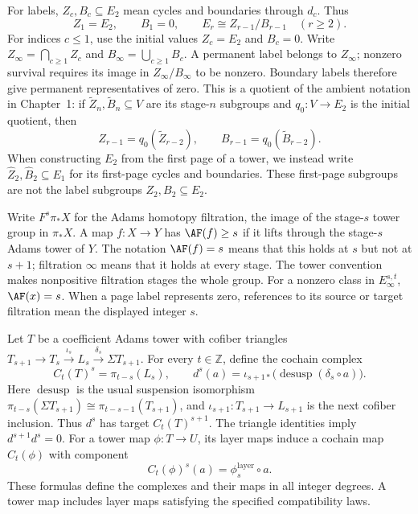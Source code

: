 For labels, $Z_c,B_c\subseteq E_2$ mean cycles and boundaries through
$d_c$. Thus
\[
 Z_1=E_2,\qquad B_1=0,\qquad E_r\cong Z_{r-1}/B_{r-1}\quad(r\ge2).
\]
For indices $c\leq1$, use the initial values $Z_c=E_2$ and $B_c=0$.
Write $Z_\infty=\bigcap_{c\ge1}Z_c$ and
$B_\infty=\bigcup_{c\ge1}B_c$. A permanent label belongs to
$Z_\infty$; nonzero survival requires its image in
$Z_\infty/B_\infty$ to be nonzero. Boundary labels therefore give
permanent representatives of zero.
This is a quotient of the ambient notation in Chapter~1: if
$\widetilde Z_n,\widetilde B_n\subseteq V$ are its stage-$n$ subgroups
and $q_0:V\to E_2$ is the initial quotient, then
\[
 Z_{r-1}=q_0(\widetilde Z_{r-2}),\qquad
 B_{r-1}=q_0(\widetilde B_{r-2}).
\]
When constructing $E_2$ from the first page of a tower, we instead write
$\widehat Z_2,\widehat B_2\subseteq E_1$ for its first-page cycles and
boundaries. These first-page subgroups are not the label subgroups
$Z_2,B_2\subseteq E_2$.

Write $F^s\pi_*X$ for the Adams homotopy filtration, the image of the
stage-$s$ tower group in $\pi_*X$. A map $f:X\to Y$ has
$\AF(f)\ge s$ if it lifts through the stage-$s$ Adams tower of $Y$.
The notation $\AF(f)=s$ means that this holds at $s$ but not at $s+1$;
filtration $\infty$ means that it holds at every stage. The tower
convention makes nonpositive filtration stages the whole group. For a
nonzero class in $E_\infty^{s,t}$, $\AF(x)=s$. When a page label
represents zero, references to its source or target filtration mean the
displayed integer $s$.


\begin{definition}
\label{sem:AdamsSynthetic:coefficient-tower-cochain}
Let $T$ be a coefficient Adams tower with cofiber triangles
$T_{s+1}\to T_s\xrightarrow{\iota_s}L_s\xrightarrow{\delta_s}\Sigma T_{s+1}$.
For every $t\in\mathbb Z$, define the cochain complex
\[
  C_t(T)^s=\pi_{t-s}(L_s),\qquad
  d^s(a)=\iota_{s+1*}\bigl(\operatorname{desusp}(\delta_s\circ a)\bigr).
\]
Here $\operatorname{desusp}$ is the usual suspension isomorphism
$\pi_{t-s}(\Sigma T_{s+1})\cong\pi_{t-s-1}(T_{s+1})$, and
$\iota_{s+1}:T_{s+1}\to L_{s+1}$ is the next cofiber inclusion.
Thus $d^s$ has target $C_t(T)^{s+1}$.
The triangle identities imply $d^{s+1}d^s=0$.
For a tower map $\phi:T\to U$, its layer maps induce a
cochain map $C_t(\phi)$ with component
\[
  C_t(\phi)^s(a)=\phi_s^{\mathrm{layer}}\circ a.
\]
These formulas define the complexes and their maps in all integer
degrees. A tower map includes layer maps satisfying the specified compatibility laws.
\end{definition}

